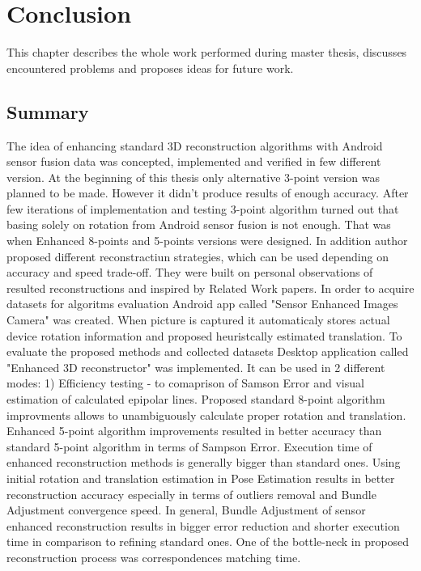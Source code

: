 
\chapter{Conclusion} %
This chapter describes the whole work performed during master thesis, discusses encountered problems and proposes ideas for future work.

\section{Summary}
The idea of enhancing standard 3D reconstruction algorithms with Android sensor fusion data was concepted, implemented and verified in few different version. At the beginning of this thesis only alternative 3-point version was planned to be made. However it didn't produce results of enough accuracy. After few iterations of implementation and testing 3-point algorithm turned out that basing solely on rotation from Android sensor fusion is not enough. That was when Enhanced 8-points and 5-points versions were designed. In addition author proposed different reconstractiun strategies, which can be used depending on accuracy and speed trade-off. They were built on personal observations of resulted reconstructions and inspired by Related Work papers.
In order to acquire datasets for algoritms evaluation Android app called "Sensor Enhanced Images Camera" was created. When picture is captured it automaticaly stores actual device rotation information and proposed heuristcally estimated translation. 
To evaluate the proposed methods and collected datasets Desktop application called "Enhanced 3D reconstructor" was implemented.
It can be used in 2 different modes:
1) Efficiency testing - to comaprison of Samson Error and visual estimation of calculated epipolar lines.   
Proposed standard 8-point algorithm improvments allows to unambiguously calculate proper rotation and translation. Enhanced 5-point algorithm improvements resulted in better accuracy than standard 5-point algorithm in terms of Sampson Error. Execution time of enhanced reconstruction methods is generally bigger than standard ones. 
Using initial rotation and translation estimation in Pose Estimation results in better reconstruction accuracy especially in terms of outliers removal and Bundle Adjustment convergence speed. 
In general, Bundle Adjustment of sensor enhanced reconstruction results in bigger error reduction and shorter execution time in comparison to refining standard ones. One of the bottle-neck in proposed reconstruction process was correspondences matching time. 
